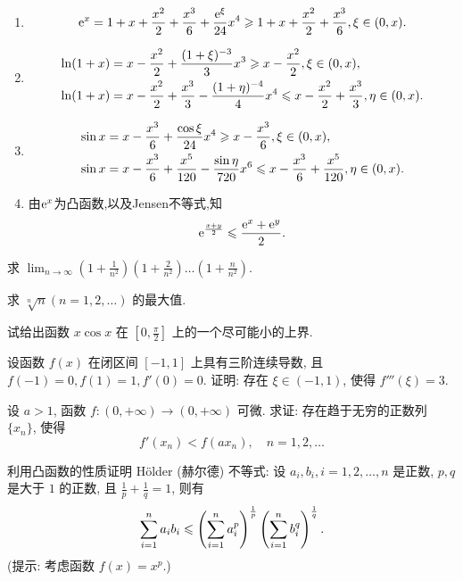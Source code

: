 \begin{solution}
    \begin{enumerate}
        \item $$\mathrm{e}^x = 1 + x + \frac{x^2}{2} + \frac{x^3}{6} + \frac{\mathrm{e}^\xi}{24} x^4 \geqslant 1 + x + \frac{x^2}{2} + \frac{x^3}{6}, \xi \in (0, x).$$
        \item \begin{align*}
            \ln(1+x) & = x - \frac{x^2}{2} + \frac{(1+\xi)^{-3}}{3} x^3 \geqslant x - \frac{x^2}{2}, \xi \in (0, x), \\
            \ln(1+x) & = x - \frac{x^2}{2} + \frac{x^3}{3} - \frac{(1+\eta)^{-4}}{4} x^4 \leqslant x - \frac{x^2}{2} + \frac{x^3}{3}, \eta \in (0, x).
        \end{align*}
        \item \begin{align*}
            \sin x & = x - \frac{x^3}{6} + \frac{\cos \xi}{24} x^4 \geqslant x - \frac{x^3}{6}, \xi \in (0, x), \\
            \sin x & = x - \frac{x^3}{6} + \frac{x^5}{120} - \frac{\sin \eta}{720} x^6 \leqslant x - \frac{x^3}{6} + \frac{x^5}{120}, \eta \in (0, x).
        \end{align*}
        \item 由$\mathrm{e}^x$为凸函数,以及Jensen不等式,知
              $$\mathrm{e}^{\frac{x+y}{2}} \leqslant \frac{\mathrm{e}^x + \mathrm{e}^y}{2}.$$
    \end{enumerate}
\end{solution}

\begin{exercise}[3.C.15]
    求 $\displaystyle \lim_{n \to \infty} \left(1 + \frac{1}{n^2}\right) \left(1 + \frac{2}{n^2}\right) \dots \left(1 + \frac{n}{n^2}\right)$.
\end{exercise}

\begin{exercise}[3.C.16]
    求 $\sqrt[n]{n} (n=1, 2, \dots)$ 的最大值.
\end{exercise}

\begin{exercise}[3.C.17]
    试给出函数 $x \cos x$ 在 $[0, \frac{\pi}{2}]$ 上的一个尽可能小的上界.
\end{exercise}

\begin{exercise}[3.C.18]
    设函数 $f(x)$ 在闭区间 $[-1, 1]$ 上具有三阶连续导数, 且 $f(-1) = 0, f(1) = 1, f'(0) = 0$. 证明: 存在 $\xi \in (-1, 1)$, 使得 $f'''(\xi) = 3$.
\end{exercise}

\begin{exercise}[3.C.19]
    设 $a > 1$, 函数 $f: (0, +\infty) \to (0, +\infty)$ 可微. 求证: 存在趋于无穷的正数列 $\{x_n\}$, 使得
    $$f'(x_n) < f(a x_n), \quad n=1, 2, \dots$$
\end{exercise}

\begin{exercise}[3.C.20]
    利用凸函数的性质证明 Hölder (赫尔德) 不等式: 设 $a_i, b_i, i = 1, 2, \dots, n$ 是正数, $p, q$ 是大于 $1$ 的正数, 且 $\frac{1}{p} + \frac{1}{q} = 1$, 则有
    $$\sum_{i=1}^n a_i b_i \leqslant \left(\sum_{i=1}^n a_i^p\right)^{\frac{1}{p}} \left(\sum_{i=1}^n b_i^q\right)^{\frac{1}{q}}.$$
    (提示: 考虑函数 $f(x) = x^p$.)
\end{exercise}